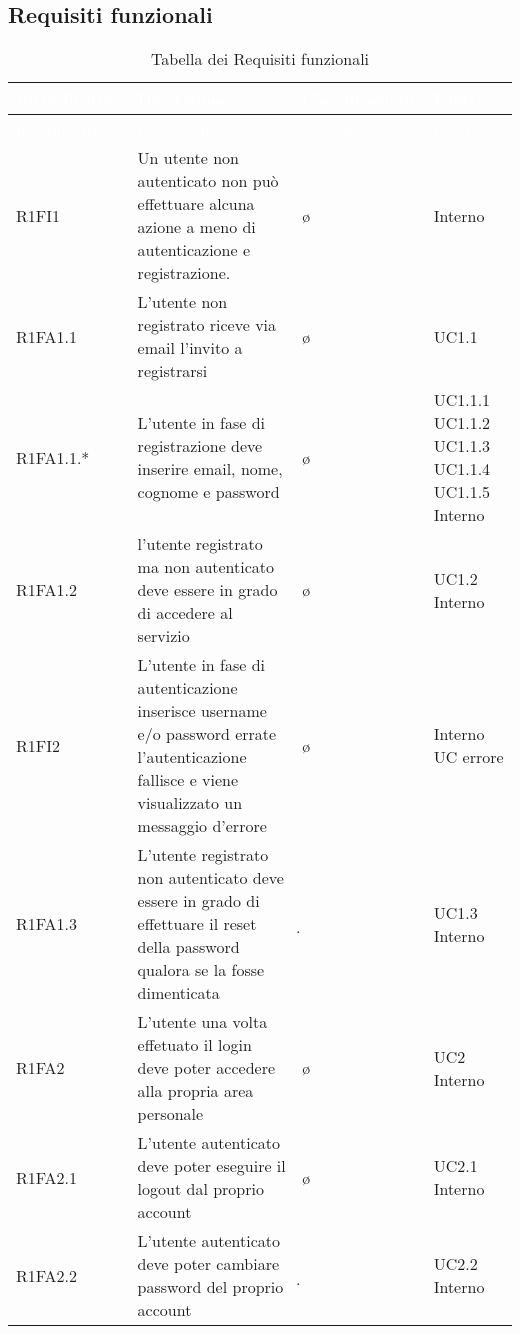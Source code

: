 \subsection{Requisiti funzionali}
    {
        \renewcommand{\arraystretch}{1.5}
        
        \begin{longtable}{ l p{7cm} l p{3cm}}
            \caption{Tabella dei Requisiti funzionali}\\
            \rowcolor{darkblue}
            \textcolor{white}{Identificativo} & \textcolor{white}{Descrizione} & \textcolor{white}{Classificazione} & \textcolor{white}{Fonti}\\	
            \endfirsthead
            \rowcolor{darkblue}
            \textcolor{white}{Identificativo} & \textcolor{white}{Descrizione} & \textcolor{white}{Classificazione} & \textcolor{white}{Fonti}\\
            \endhead
            R1FI1 & Un utente non autenticato non può effettuare alcuna azione a meno di autenticazione e registrazione. & \o & Interno\\
            R1FA1.1& L'utente non registrato riceve via email l'invito a registrarsi & \o & UC1.1\\
            R1FA1.1.* & L'utente in fase di registrazione deve inserire email, nome, cognome e password & \o & UC1.1.1 UC1.1.2 UC1.1.3 UC1.1.4 UC1.1.5 Interno\\
            R1FA1.2 & l'utente registrato ma non autenticato deve essere in grado di accedere al servizio & \o & UC1.2 Interno\\
            R1FI2 & L'utente in fase di autenticazione inserisce username e/o password errate l'autenticazione fallisce e viene visualizzato un messaggio d'errore & \o & Interno UC errore\\
            R1FA1.3 & L'utente registrato non autenticato deve essere in grado di effettuare il reset della password qualora se la fosse dimenticata & \d & UC1.3 Interno\\
            R1FA2 & L'utente una volta effetuato il login deve poter accedere alla propria area personale & \o & UC2 Interno\\
            R1FA2.1 & L'utente autenticato deve poter eseguire il logout dal proprio account & \o & UC2.1 Interno\\
            R1FA2.2 & L'utente autenticato deve poter cambiare password del proprio account & \d & UC2.2 Interno\\

\end{longtable}}
